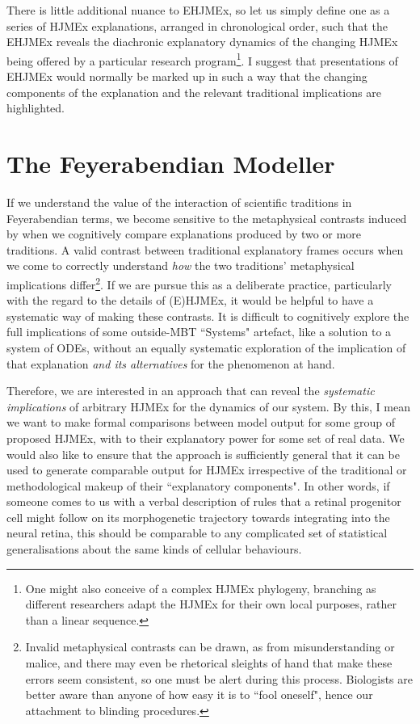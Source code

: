 There is little additional nuance to EHJMEx, so let us simply define one as a series of HJMEx explanations, arranged in chronological order, such that the EHJMEx reveals the diachronic explanatory dynamics of the changing HJMEx being offered by a particular research program\footnote{One might also conceive of a complex HJMEx phylogeny, branching as different researchers adapt the HJMEx for their own local purposes, rather than a linear sequence.}. I suggest that presentations of EHJMEx would normally be marked up in such a way that the changing components of the explanation and the relevant traditional implications are highlighted.

\section{The Feyerabendian Modeller}
\label{model}


If we understand the value of the interaction of scientific traditions in Feyerabendian terms, we become sensitive to the metaphysical contrasts induced by when we cognitively compare explanations produced by two or more traditions. A valid contrast between traditional explanatory frames occurs when we come to correctly understand \textit{how} the two traditions' metaphysical implications differ\footnote{Invalid metaphysical contrasts can be drawn, as from misunderstanding or malice, and there may even be rhetorical sleights of hand that make these errors seem consistent, so one must be alert during this process. Biologists are better aware than anyone of how easy it is to ``fool oneself", hence our attachment to blinding procedures.}. If we are pursue this as a deliberate practice, particularly with the regard to the details of (E)HJMEx, it would be helpful to have a systematic way of making these contrasts. It is difficult to cognitively explore the full implications of some outside-MBT ``Systems" artefact, like a solution to a system of ODEs, without an equally systematic exploration of the implication of that explanation \textit{and its alternatives} for the phenomenon at hand.

Therefore, we are interested in an approach that can reveal the \textit{systematic implications} of arbitrary HJMEx for the dynamics of our system. By this, I mean we want to make formal comparisons between model output for some group of proposed HJMEx, with to their explanatory power for some set of real data. We would also like to ensure that the approach is sufficiently general that it can be used to generate comparable output for HJMEx irrespective of the traditional or methodological makeup of their ``explanatory components". In other words, if someone comes to us with a verbal description of rules that a retinal progenitor cell might follow on its morphogenetic trajectory towards integrating into the neural retina, this should be comparable to any complicated set of statistical generalisations about the same kinds of cellular behaviours.
